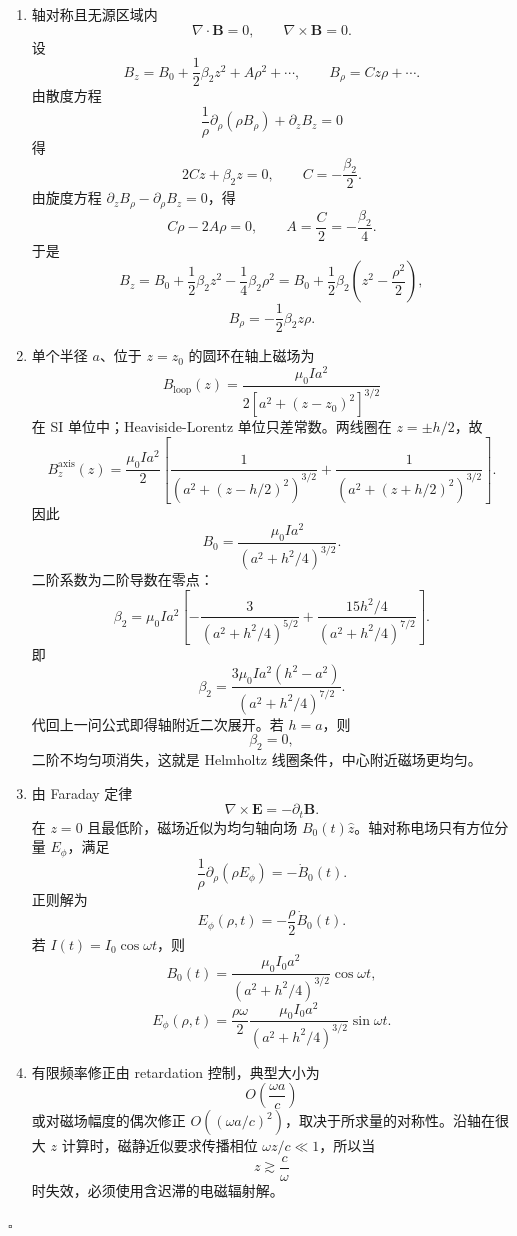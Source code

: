 \documentclass[UTF8,12pt]{ctexart}
\newenvironment{solution}{%
  \par\medskip
  \noindent{\bfseries 解答}\quad\ignorespaces
}{\hfill$\square$\par\medskip}
\begin{document}
\begin{solution}
\begin{enumerate}[label=(\arabic*)]
\item 轴对称且无源区域内
\[
\nabla\cdot\bm B=0,\qquad \nabla\times\bm B=0.
\]
设
\[
B_z=B_0+\frac12\beta_2z^2+A\rho^2+\cdots,\qquad
B_\rho=Cz\rho+\cdots.
\]
由散度方程
\[
\frac1\rho\partial_\rho(\rho B_\rho)+\partial_zB_z=0
\]
得
\[
2Cz+\beta_2z=0,\qquad C=-\frac{\beta_2}{2}.
\]
由旋度方程 \(\partial_zB_\rho-\partial_\rho B_z=0\)，得
\[
C\rho-2A\rho=0,\qquad A=\frac C2=-\frac{\beta_2}{4}.
\]
于是
\[
B_z=B_0+\frac12\beta_2z^2-\frac14\beta_2\rho^2
=B_0+\frac12\beta_2\left(z^2-\frac{\rho^2}{2}\right),
\]
\[
B_\rho=-\frac12\beta_2z\rho.
\]

\item 单个半径 \(a\)、位于 \(z=z_0\) 的圆环在轴上磁场为
\[
B_{\mathrm{loop}}(z)
=\frac{\mu_0 I a^2}{2[a^2+(z-z_0)^2]^{3/2}}
\]
在 SI 单位中；Heaviside-Lorentz 单位只差常数。两线圈在 \(z=\pm h/2\)，故
\[
B_z^{\mathrm{axis}}(z)
=\frac{\mu_0 I a^2}{2}
\left[
\frac1{(a^2+(z-h/2)^2)^{3/2}}
+\frac1{(a^2+(z+h/2)^2)^{3/2}}
\right].
\]
因此
\[
B_0=\frac{\mu_0 I a^2}{(a^2+h^2/4)^{3/2}}.
\]
二阶系数为二阶导数在零点：
\[
\beta_2
=\mu_0 I a^2
\left[
-\frac{3}{(a^2+h^2/4)^{5/2}}
+\frac{15h^2/4}{(a^2+h^2/4)^{7/2}}
\right].
\]
即
\[
\beta_2
=\frac{3\mu_0 I a^2(h^2-a^2)}
{(a^2+h^2/4)^{7/2}}.
\]
代回上一问公式即得轴附近二次展开。若 \(h=a\)，则
\[
\beta_2=0,
\]
二阶不均匀项消失，这就是 Helmholtz 线圈条件，中心附近磁场更均匀。

\item 由 Faraday 定律
\[
\nabla\times\bm E=-\partial_t\bm B.
\]
在 \(z=0\) 且最低阶，磁场近似为均匀轴向场 \(B_0(t)\hat z\)。轴对称电场只有方位分量 \(E_\phi\)，满足
\[
\frac1\rho\partial_\rho(\rho E_\phi)=-\dot B_0(t).
\]
正则解为
\[
E_\phi(\rho,t)=-\frac{\rho}{2}\dot B_0(t).
\]
若 \(I(t)=I_0\cos\omega t\)，则
\[
B_0(t)=\frac{\mu_0 I_0a^2}{(a^2+h^2/4)^{3/2}}\cos\omega t,
\]
\[
E_\phi(\rho,t)
=\frac{\rho\omega}{2}
\frac{\mu_0 I_0a^2}{(a^2+h^2/4)^{3/2}}\sin\omega t.
\]

\item 有限频率修正由 retardation 控制，典型大小为
\[
O\left(\frac{\omega a}{c}\right)
\]
或对磁场幅度的偶次修正 \(O((\omega a/c)^2)\)，取决于所求量的对称性。沿轴在很大 \(z\) 计算时，磁静近似要求传播相位 \(\omega z/c\ll1\)，所以当
\[
z\gtrsim \frac c\omega
\]
时失效，必须使用含迟滞的电磁辐射解。
\end{enumerate}
\end{solution}
\end{document}
